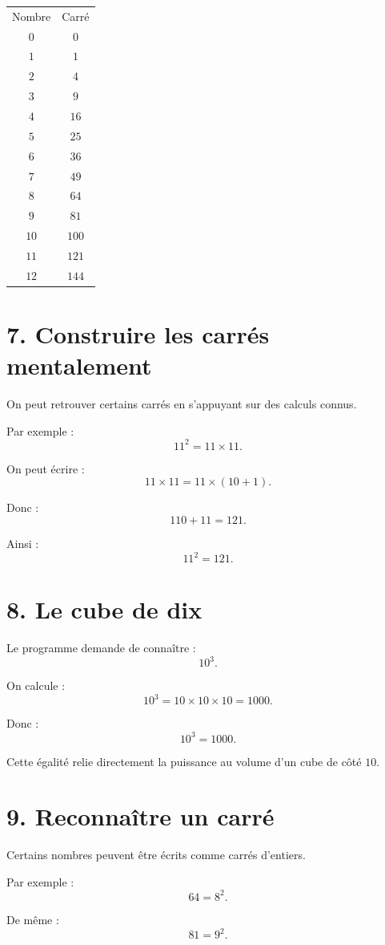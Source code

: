 \begin{tabular}{c|c}
Nombre & Carré \\
$0$ & $0$ \\
$1$ & $1$ \\
$2$ & $4$ \\
$3$ & $9$ \\
$4$ & $16$ \\
$5$ & $25$ \\
$6$ & $36$ \\
$7$ & $49$ \\
$8$ & $64$ \\
$9$ & $81$ \\
$10$ & $100$ \\
$11$ & $121$ \\
$12$ & $144$ \\
\end{tabular}

\section{7. Construire les carrés mentalement}

On peut retrouver certains carrés en s'appuyant sur des calculs connus.

Par exemple :
\[
11^2=11\times11.
\]

On peut écrire :
\[
11\times11=11\times(10+1).
\]

Donc :
\[
110+11=121.
\]

Ainsi :
\[
\boxed{11^2=121}.
\]

\section{8. Le cube de dix}

Le programme demande de connaître :
\[
10^3.
\]

On calcule :
\[
10^3=10\times10\times10=1000.
\]

Donc :
\[
\boxed{10^3=1000}.
\]

Cette égalité relie directement la puissance au volume d'un cube de côté $10$.

\section{9. Reconnaître un carré}

Certains nombres peuvent être écrits comme carrés d'entiers.

Par exemple :
\[
64=8^2.
\]

De même :
\[
81=9^2.
\]

